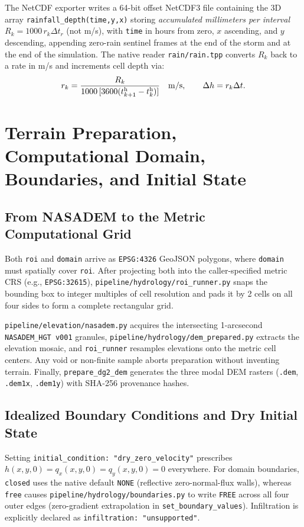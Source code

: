 \documentclass[11pt,a4paper]{article}
\newcommand{\src}[1]{\nolinkurl{#1}}
\newcommand{\unit}[1]{\mathrm{#1}}
\begin{document}
The NetCDF exporter writes a 64-bit offset NetCDF3 file containing the 3D array \texttt{rainfall\_depth(time,y,x)} storing \emph{accumulated millimeters per interval} $R_k=1000\,r_k\Delta t_r$ (not m/s), with \texttt{time} in hours from zero, $x$ ascending, and $y$ descending, appending zero-rain sentinel frames at the end of the storm and at the end of the simulation. The native reader \src{rain/rain.tpp} converts $R_k$ back to a rate in m/s and increments cell depth via:
\begin{equation}
 r_k=\frac{R_k}{1000\,[3600(t_{k+1}^{\rm h}-t_k^{\rm h})]}\quad\unit{m/s},
 \qquad \Delta h=r_k\Delta t.\label{eq:ncrain}
\end{equation}

\section{Terrain Preparation, Computational Domain, Boundaries, and Initial State}
\label{sec:entradas}
\subsection{From NASADEM to the Metric Computational Grid}
Both \texttt{roi} and \texttt{domain} arrive as \texttt{EPSG:4326} GeoJSON polygons, where \texttt{domain} must spatially cover \texttt{roi}. After projecting both into the caller-specified metric CRS (e.g., \texttt{EPSG:32615}), \src{pipeline/hydrology/roi_runner.py} snaps the bounding box to integer multiples of cell resolution and pads it by 2 cells on all four sides to form a complete rectangular grid.

\src{pipeline/elevation/nasadem.py} acquires the intersecting 1-arcsecond \texttt{NASADEM\_HGT v001} granules, \src{pipeline/hydrology/dem_prepared.py} extracts the elevation mosaic, and \texttt{roi\_runner} resamples elevations onto the metric cell centers. Any void or non-finite sample aborts preparation without inventing terrain. Finally, \texttt{prepare\_dg2\_dem} generates the three modal DEM rasters (\texttt{.dem}, \texttt{.dem1x}, \texttt{.dem1y}) with SHA-256 provenance hashes.

\subsection{Idealized Boundary Conditions and Dry Initial State}
Setting \texttt{initial\_condition: "dry\_zero\_velocity"} prescribes $h(x,y,0)=q_x(x,y,0)=q_y(x,y,0)=0$ everywhere. For domain boundaries, \texttt{closed} uses the native default \texttt{NONE} (reflective zero-normal-flux walls), whereas \texttt{free} causes \src{pipeline/hydrology/boundaries.py} to write \texttt{FREE} across all four outer edges (zero-gradient extrapolation in \texttt{set\_boundary\_values}). Infiltration is explicitly declared as \texttt{infiltration: "unsupported"}.
\end{document}
